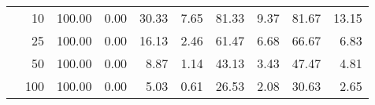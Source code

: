 \begin{table}
\begin{tabular}[t]{rrrrrrrrrr}
 & 10 & 100.00 & 0.00 & 30.33 & 7.65 & 81.33 & 9.37 & 81.67 & 13.15\\

 & 25 & 100.00 & 0.00 & 16.13 & 2.46 & 61.47 & 6.68 & 66.67 & 6.83\\

 & 50 & 100.00 & 0.00 & 8.87 & 1.14 & 43.13 & 3.43 & 47.47 & 4.81\\

\multirow{-5}{*}{\raggedleft\arraybackslash 400} & 100 & 100.00 & 0.00 & 5.03 & 0.61 & 26.53 & 2.08 & 30.63 & 2.65\\
\bottomrule
\end{tabular}
\end{table}